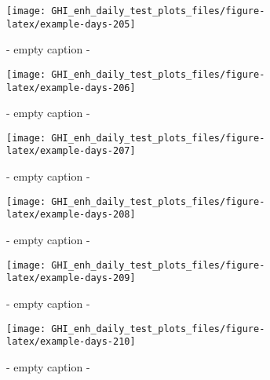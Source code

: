 \documentclass[
  10pt,
  a4paper,oneside]{article}
\begin{document}
\begin{figure}[H]

{\centering \texttt{[image: GHI\_enh\_daily\_test\_plots\_files/figure-latex/example-days-205]} 

}

\caption{ - empty caption - }\label{fig:example-days-205}
\end{figure}

\begin{figure}[H]

{\centering \texttt{[image: GHI\_enh\_daily\_test\_plots\_files/figure-latex/example-days-206]} 

}

\caption{ - empty caption - }\label{fig:example-days-206}
\end{figure}

\begin{figure}[H]

{\centering \texttt{[image: GHI\_enh\_daily\_test\_plots\_files/figure-latex/example-days-207]} 

}

\caption{ - empty caption - }\label{fig:example-days-207}
\end{figure}

\begin{figure}[H]

{\centering \texttt{[image: GHI\_enh\_daily\_test\_plots\_files/figure-latex/example-days-208]} 

}

\caption{ - empty caption - }\label{fig:example-days-208}
\end{figure}

\begin{figure}[H]

{\centering \texttt{[image: GHI\_enh\_daily\_test\_plots\_files/figure-latex/example-days-209]} 

}

\caption{ - empty caption - }\label{fig:example-days-209}
\end{figure}

\begin{figure}[H]

{\centering \texttt{[image: GHI\_enh\_daily\_test\_plots\_files/figure-latex/example-days-210]} 

}

\caption{ - empty caption - }\label{fig:example-days-210}
\end{figure}
\end{document}
